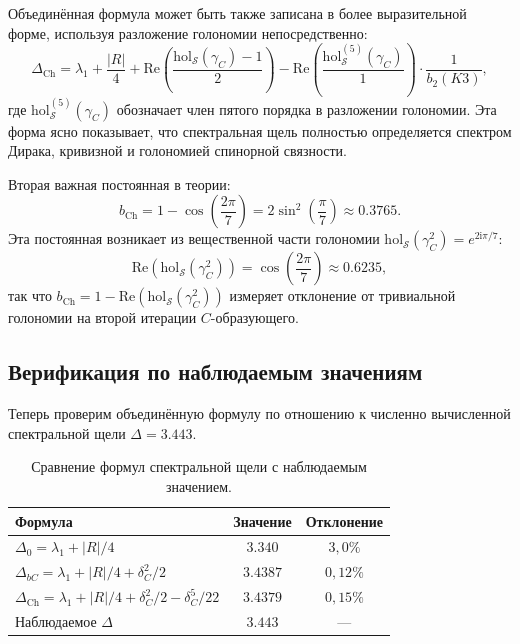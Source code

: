 \documentclass[12pt,a4paper]{article}
\theoremstyle{definition}
\theoremstyle{remark}
\newcommand{\hol}{\mathrm{hol}}
\newcommand{\cS}{\mathcal{S}}
\newcommand{\ii}{\mathrm{i}}
\begin{document}
Объединённая формула может быть также записана в более выразительной форме, используя разложение голономии непосредственно:
\begin{equation}
\Delta_{\mathrm{Ch}} = \lambda_1 + \frac{|R|}{4} + \mathrm{Re}\left(\frac{\hol_{\cS}(\gamma_C) - 1}{2}\right) - \mathrm{Re}\left(\frac{\hol^{(5)}_{\cS}(\gamma_C)}{1}\right) \cdot \frac{1}{b_2(K3)},
\end{equation}
где $\hol^{(5)}_{\cS}(\gamma_C)$ обозначает член пятого порядка в разложении голономии. Эта форма ясно показывает, что спектральная щель полностью определяется спектром Дирака, кривизной и голономией спинорной связности.

Вторая важная постоянная в теории:
\begin{equation}
b_{\mathrm{Ch}} = 1 - \cos\left(\frac{2\pi}{7}\right) = 2\sin^2\left(\frac{\pi}{7}\right) \approx 0.3765.
\end{equation}
Эта постоянная возникает из вещественной части голономии $\hol_{\cS}(\gamma_C^2) = e^{2\ii\pi/7}$:
\begin{equation}
\mathrm{Re}(\hol_{\cS}(\gamma_C^2)) = \cos\left(\frac{2\pi}{7}\right) \approx 0.6235,
\end{equation}
так что $b_{\mathrm{Ch}} = 1 - \mathrm{Re}(\hol_{\cS}(\gamma_C^2))$ измеряет отклонение от тривиальной голономии на второй итерации $C$-образующего.

\subsection{Верификация по наблюдаемым значениям}

Теперь проверим объединённую формулу по отношению к численно вычисленной спектральной щели $\Delta = 3.443$.

\begin{table}[H]
\centering
\begin{tabular}{lcc}
\toprule
\textbf{Формула} & \textbf{Значение} & \textbf{Отклонение} \\
\midrule
$\Delta_0 = \lambda_1 + |R|/4$ & $3.340$ & $3{,}0\%$ \\
$\Delta_{bC} = \lambda_1 + |R|/4 + \delta_C^2/2$ & $3.4387$ & $0{,}12\%$ \\
$\Delta_{\mathrm{Ch}} = \lambda_1 + |R|/4 + \delta_C^2/2 - \delta_C^5/22$ & $3.4379$ & $0{,}15\%$ \\
\midrule
Наблюдаемое $\Delta$ & $3.443$ & --- \\
\bottomrule
\end{tabular}
\caption{Сравнение формул спектральной щели с наблюдаемым значением.}
\label{tab:comparison}
\end{table}
\end{document}
